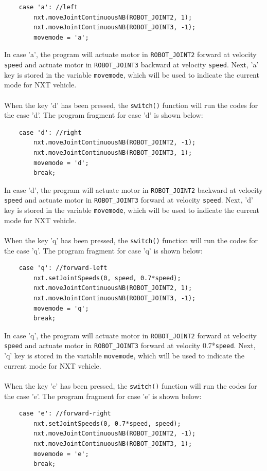 \begin{verbatim} 
    case 'a': //left
        nxt.moveJointContinuousNB(ROBOT_JOINT2, 1);
        nxt.moveJointContinuousNB(ROBOT_JOINT3, -1);
        movemode = 'a';
\end{verbatim}
In case 'a', the program will actuate motor in \verb+ROBOT_JOINT2+ forward at velocity \verb+speed+ 
and actuate motor in \verb+ROBOT_JOINT3+ backward at velocity \verb+speed+. Next, 'a' key is stored in the variable \verb+movemode+, which will be used to 
indicate the current mode for NXT vehicle.
\\ \\
\noindent
When the key 'd' has been pressed, the \verb+switch()+ function will run the codes for the case 'd'.
The program fragment for case 'd' is shown below:
\begin{verbatim} 
    case 'd': //right
        nxt.moveJointContinuousNB(ROBOT_JOINT2, -1);
        nxt.moveJointContinuousNB(ROBOT_JOINT3, 1);
        movemode = 'd';
        break;
\end{verbatim}
In case 'd', the program will actuate motor in \verb+ROBOT_JOINT2+ backward at velocity \verb+speed+ 
and actuate motor in \verb+ROBOT_JOINT3+ forward at velocity \verb+speed+. Next, 'd' key is stored in
the variable \verb+movemode+, which will be used to indicate the current mode for NXT vehicle.
\\ \\
\noindent
When the key 'q' has been pressed, the \verb+switch()+ function will run the codes for the case 'q'.
The program fragment for case 'q' is shown below:
\begin{verbatim} 
    case 'q': //forward-left
        nxt.setJointSpeeds(0, speed, 0.7*speed);
        nxt.moveJointContinuousNB(ROBOT_JOINT2, 1);
        nxt.moveJointContinuousNB(ROBOT_JOINT3, -1);
        movemode = 'q';
        break;
\end{verbatim}
In case 'q', the program will actuate motor in \verb+ROBOT_JOINT2+ forward at velocity \verb+speed+ 
and actuate motor in \verb+ROBOT_JOINT3+ forward at velocity 0.7*\verb+speed+. Next, 'q' key is 
stored in the variable \verb+movemode+, which will be used to indicate the current mode for NXT 
vehicle.
\\ \\
\noindent 
When the key 'e' has been pressed, the \verb+switch()+ function will run the codes for the case 'e'.
The program fragment for case 'e' is shown below:
\begin{verbatim} 
    case 'e': //forward-right
        nxt.setJointSpeeds(0, 0.7*speed, speed);
        nxt.moveJointContinuousNB(ROBOT_JOINT2, -1);
        nxt.moveJointContinuousNB(ROBOT_JOINT3, 1);
        movemode = 'e';
        break;
\end{verbatim}
